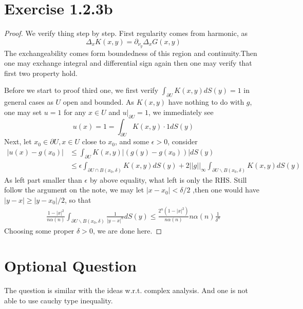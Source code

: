 \section*{Exercise 1.2.3b}
\begin{proof}
    We verify thing step by step. First regularity comes from harmonic, as \begin{equation*}
        \Delta_x K(x,y) = \partial_{\nu_y} \Delta_x G(x,y)
    \end{equation*} The exchangeability comes form boundedness of this region and continuity.Then one may exchange integral and differential sign again then one may verify that first two property hold.

    Before we start to proof third one, we first verify $\int_{\partial U} K(x,y) dS(y) = 1$ in general cases as $U$ open and bounded. As $K(x,y)$ have nothing to do with $g$, one may set $u = 1$ for any $x \in U$ and $u|_{\partial U} = 1$, we immediately see
    \begin{equation*}
        u(x) = 1 = \int_{\partial U} K(x,y) \cdot 1 dS(y)
    \end{equation*}
    Next, let $x_0\in \partial U, x \in U$ close to $x_0$, and some $\epsilon>0$, consider 
    \begin{align*}
        |u(x)-g(x_0)| & \leq \int_{\partial U} K(x,y) |\left(g(y)-g(x_0)\right)|dS(y)\\
                    &\leq \epsilon \int_{\partial U \cap B(x_0,\delta)} K(x,y) dS(y) +  2||g||_\infty\int_{\partial U \backslash B(x_0,\delta)} K(x,y) dS(y)
    \end{align*}
    As left part smaller than $\epsilon$ by above equality, what left is only the RHS. Still follow the argument on the note, we may let $|x-x_0| < \delta/2$ ,then one would have $|y-x| \geq |y-x_0|/2$, so that 
    \begin{align*}
      \frac{1-|x|^2}{n\alpha(n)} \int_{\partial U \backslash B(x_0,\delta)} \frac{1}{|y-x|^n}  dS(y) \leq \frac{2^n(1-|x|^2)}{n\alpha(n)} n \alpha(n) \frac{1}{\delta^n}
    \end{align*}
    Choosing some proper $\delta>0$, we are done here.
\end{proof}


\section*{Optional Question}
The question is similar with the ideas w.r.t. complex analysis. And one is not able to use cauchy type inequality.


